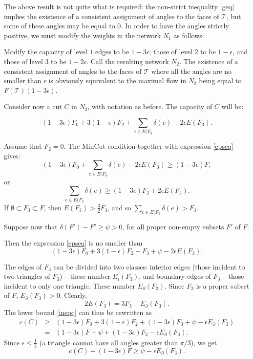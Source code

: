 \documentclass{acmart}
\begin{document}
The above result is not quite what is required: the non-strict
inequality \ref{geq} implies the existence of a consistent assignment 
of angles to the faces of $\mathcal{T}$, but some of these angles may be 
equal to $0$. In order to have the angles strictly positive, we must 
modify the weights in the network $N_{1}$ as follows:

Modify the capacity of level $1$ edges to be $1-3\epsilon$; those of 
level $2$ to be $1-\epsilon$, and those of level $3$ to be 
$1-2\epsilon$. Call the resulting network $N_{2}$. The existence of 
a consistent assignment of angles to the faces of $\mathcal{T}$ where all 
the angles are no smaller than $\epsilon$ is obviously equivalent to 
the maximal flow in $N_{2}$ being equal to $F(\mathcal{T})(1-3 \epsilon)$.

Consider now a cut $C$ in $N_{2}$, with notation as before. The
capacity of $C$ will be: 

\begin{equation}
\label{epseq}
(1-3\epsilon)F_{0} + 3 (1-\epsilon)F_{2} + \sum_{e\in E(F_{3}} 
\delta(e) - 2\epsilon E(F_{3}).
\end{equation}

Assume that $F_{2} = 0$. The MinCut condition together with expression 
\ref{epseq} gives:
$$
(1-3\epsilon)F_{0} + \sum_{e\in E(F_{3}} 
\delta(e) - 2\epsilon E(F_{3}) \geq (1-3\epsilon) F,
$$
or
$$
\sum_{e\in E(F_{3}} \delta(e) \geq (1-3\epsilon)F_{3} + 2\epsilon 
E(F_{3}).
$$
If $\emptyset \subset F_{3}\subset F$, then $E(F_{3}) > 
\frac32 F_{3}$, and so
$\sum_{e\in E(F_{3}}\delta(e) > F_{3}.$

Suppose now that $\delta(F') - F' \geq \psi > 0$, for all proper 
non-empty subsets $F'$ of $F$.

Then the expression \ref{epseq} is no smaller than
\begin{equation}
\label{ineqq}
(1-3\epsilon)F_{0} + 3 (1-\epsilon)F_{2} + F_{3}+\psi- 2\epsilon E(F_{3}).
\end{equation}

The edges of $F_{3}$ can be divided into two classes: interior 
edges (those incident to two triangles of $F_{3}$) -- these number
$E_{i}(F_{3})$, and boundary edges of $F_{3}$ -- those incident to 
only one triangle. These number $E_{\partial}(F_{3})$. Since $F_{3}$ is 
a proper subset of $F$, $E_{\partial}(F_{3})>0$. Clearly,
\begin{equation}
2 E(F_{3}) = 3 F_{3} + E_{\partial}(F_{3}).
\end{equation}
The lower bound \ref{ineqq} can thus be rewritten as
\begin{eqnarray}
c(C) & \geq &(1-3\epsilon)F_{0} + 3 (1-\epsilon)F_{2} +
(1-3\epsilon)F_{3}+\psi- \epsilon E_{\partial}(F_{3}) \\
& = & (1-3\epsilon) F + \psi +  (1-3\epsilon)F_{2} - \epsilon
E_{\partial}(F_{3}). 
\end{eqnarray}
Since $\epsilon\leq\frac13$ (a triangle cannot have all angles greater 
than $\pi/3$), we get
\begin{equation}
c(C) -(1-3 \epsilon)F\geq \psi - \epsilon E_{\partial}(F_{3}).
\end{equation}
\end{document}

